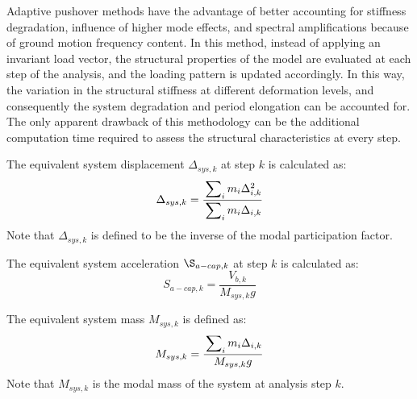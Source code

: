 Adaptive pushover methods have the advantage of better accounting for stiffness degradation, influence of higher mode effects, and spectral amplifications because of ground motion frequency content. In this method, instead of applying an invariant load vector, the structural properties of the model are evaluated at each step of the analysis, and the loading pattern is updated accordingly. In this way, the variation in the structural stiffness at different deformation levels, and consequently the system degradation and period elongation can be accounted for. The only apparent drawback of this methodology can be the additional computation time required to assess the structural characteristics at every step.

The equivalent system displacement $\Delta_{sys,k}$ at step $k$ is calculated as:
\begin{equation}
	\Delta_{sys,k} = \frac{\sideset{}{_i}\sum m_i \Delta_{i,k}^2}{\sideset{}{_i}\sum m_i \Delta_{i,k}}
\end{equation}
Note that $\Delta_{sys,k}$ is defined to be the inverse of the modal participation factor.

The equivalent system acceleration $\S_{a-cap,k}$ at step $k$ is calculated as:
\begin{equation}
	S_{a-cap,k} = \frac{V_{b,k}}{M_{sys,k} g}
\end{equation}

The equivalent system mass $M_{sys,k}$ is defined as:
\begin{equation}
	M_{sys,k} = \frac{\sideset{}{_i}\sum m_i \Delta_{i,k}}{M_{sys,k} g}
\end{equation}
Note that $M_{sys,k}$ is the modal mass of the system at analysis step $k$.